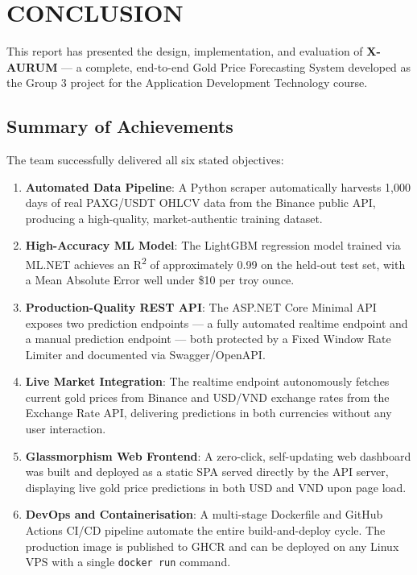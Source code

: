 \section*{CONCLUSION}

This report has presented the design, implementation, and evaluation of \textbf{X-AURUM} --- a complete, end-to-end Gold Price Forecasting System developed as the Group 3 project for the Application Development Technology course.

\subsection*{Summary of Achievements}

The team successfully delivered all six stated objectives:

\begin{enumerate}
  \item \textbf{Automated Data Pipeline}: A Python scraper automatically harvests 1,000 days of real PAXG/USDT OHLCV data from the Binance public API, producing a high-quality, market-authentic training dataset.

  \item \textbf{High-Accuracy ML Model}: The LightGBM regression model trained via ML.NET achieves an R\textsuperscript{2} of approximately 0.99 on the held-out test set, with a Mean Absolute Error well under \$10 per troy ounce.

  \item \textbf{Production-Quality REST API}: The ASP.NET Core Minimal API exposes two prediction endpoints --- a fully automated realtime endpoint and a manual prediction endpoint --- both protected by a Fixed Window Rate Limiter and documented via Swagger/OpenAPI.

  \item \textbf{Live Market Integration}: The realtime endpoint autonomously fetches current gold prices from Binance and USD/VND exchange rates from the Exchange Rate API, delivering predictions in both currencies without any user interaction.

  \item \textbf{Glassmorphism Web Frontend}: A zero-click, self-updating web dashboard was built and deployed as a static SPA served directly by the API server, displaying live gold price predictions in both USD and VND upon page load.

  \item \textbf{DevOps and Containerisation}: A multi-stage Dockerfile and GitHub Actions CI/CD pipeline automate the entire build-and-deploy cycle. The production image is published to GHCR and can be deployed on any Linux VPS with a single \texttt{docker run} command.
\end{enumerate}


